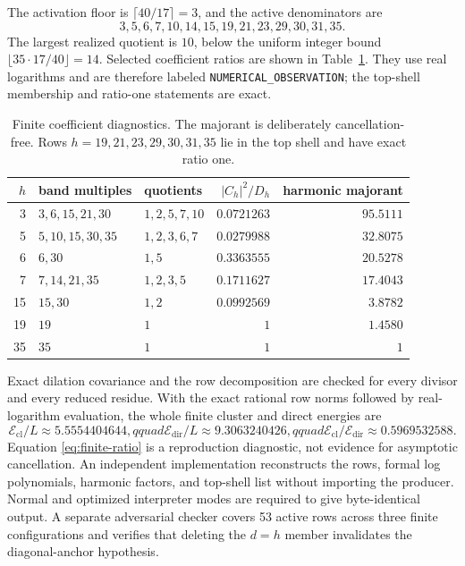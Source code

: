 \documentclass[11pt]{article}
\theoremstyle{definition}
\theoremstyle{remark}
\newcommand{\Ecl}{\mathcal E_{\mathrm{cl}}}
\newcommand{\Edir}{\mathcal E_{\mathrm{dir}}}
\begin{document}
The activation floor is
\(
\lceil40/17\rceil=3
\), and the active denominators are
\begin{equation}
 3,5,6,7,10,14,15,19,21,23,29,30,31,35.
 \label{eq:active-fixture}
\end{equation}
The largest realized quotient is $10$, below the uniform integer bound
\(\lfloor35\cdot17/40\rfloor=14\).  Selected coefficient ratios are shown in
Table~\ref{tab:fixture}.  They use real logarithms and are therefore labeled
\texttt{NUMERICAL\_OBSERVATION}; the top-shell membership and ratio-one
statements are exact.

\begin{table}[t]
\centering
\small
\begin{tabular}{@{}rllrr@{}}
\toprule
$h$ & band multiples & quotients & $|C_h|^2/D_h$ & harmonic majorant \\
\midrule
3  & $3,6,15,21,30$ & $1,2,5,7,10$ & $0.0721263$ & $95.5111$ \\
5  & $5,10,15,30,35$ & $1,2,3,6,7$ & $0.0279988$ & $32.8075$ \\
6  & $6,30$ & $1,5$ & $0.3363555$ & $20.5278$ \\
7  & $7,14,21,35$ & $1,2,3,5$ & $0.1711627$ & $17.4043$ \\
15 & $15,30$ & $1,2$ & $0.0992569$ & $3.8782$ \\
19 & $19$ & $1$ & $1$ & $1.4580$ \\
35 & $35$ & $1$ & $1$ & $1$ \\
\bottomrule
\end{tabular}
\caption{Finite coefficient diagnostics.  The majorant is deliberately
cancellation-free.  Rows $h=19,21,23,29,30,31,35$ lie in the top shell and
have exact ratio one.}
\label{tab:fixture}
\end{table}

Exact dilation covariance and the row decomposition are checked for every
divisor and every reduced residue.  With the exact rational row norms followed
by real-logarithm evaluation, the whole finite cluster and direct energies are
\begin{equation}
 \Ecl/L\approx5.5554404644,qquad
 \Edir/L\approx9.3063240426,qquad
 \Ecl/\Edir\approx0.5969532588.
 \label{eq:finite-ratio}
\end{equation}
Equation \eqref{eq:finite-ratio} is a reproduction diagnostic, not evidence
for asymptotic cancellation.  An independent implementation reconstructs the
rows, formal log polynomials, harmonic factors, and top-shell list without
importing the producer.  Normal and optimized interpreter modes are required
to give byte-identical output.  A separate adversarial checker covers 53
active rows across three finite configurations and verifies that deleting the
$d=h$ member invalidates the diagonal-anchor hypothesis.
\end{document}
